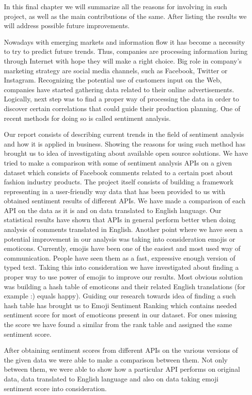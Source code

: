 In this final chapter we will summarize all the reasons for involving in such project, as well as the main contributions of the same. After listing the results we will address possible future improvements.

Nowadays with emerging markets and information flow it has become a necessity to try to predict future trends. Thus, companies are processing information luring through Internet with hope they will make a right choice. Big role in company's marketing strategy are social media channels, such as Facebook, Twitter or Instagram. Recognizing the potential use of customers input on the Web, companies have started gathering data related to their online advertisements. Logically, next step was to find a proper way of processing the data in order to discover certain correlations that could guide their production planning. One of recent methods for doing so is called sentiment analysis.

Our report consists of describing current trends in the field of sentiment analysis and how it is applied in business. Showing the reasons for using such method has brought us to idea of investigating about available open source solutions. We have tried to make a comparison with some of sentiment analysis APIs on a given dataset which consists of Facebook comments related to a certain post about fashion industry products. The project itself consists of building a framework representing in a user-friendly way data that has been provided to us with obtained sentiment results of different APIs. We have made a comparison of each API on the data as it is and on data translated to English language. Our statistical results have shown that APIs in general perform better when doing analysis of comments translated in English. Another point where we have seen a potential improvement in our analysis was taking into consideration emojis or emoticons. Currently, emojis have been one of the easiest and most used way of communication. People have seen them as a fast, expressive enough version of typed text. Taking this into consideration we have investigated about finding a proper way to use power of emojis to improve our results. Most obvious solution was building a hash table of emoticons and their related English translations (for example :) equals happy). Guiding our research towards idea of finding a such hash table has brought us to Emoji Sentiment Ranking which contains needed sentiment score for most of emoticons present in our dataset. For ones missing the score we have found a similar from the rank table and assigned the same sentiment score.

After obtaining sentiment scores from different APIs on the various versions of the given data we were able to make a comparison between them. Not only between them, we were able to show how a particular API performs on original data, data translated to English language and also on data taking emoji sentiment score into consideration.
